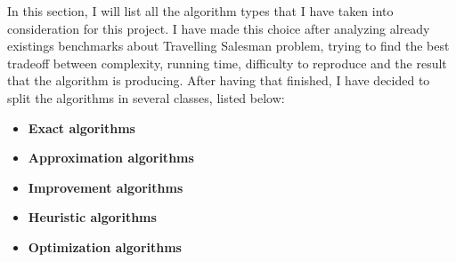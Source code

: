 \documentclass[12pt,twoside,notitlepage]{report}
\begin{document}
In this section, I will list all the algorithm types that I have taken into consideration for this project. I have made this choice after analyzing already existings benchmarks about Travelling Salesman problem, trying to find the best tradeoff between complexity, running time, difficulty to reproduce and the result that the algorithm is producing. After having that finished, I have decided to split the algorithms in several classes, listed below:

\begin{itemize}

\item {\bf Exact algorithms}
\item {\bf Approximation algorithms}
\item {\bf Improvement algorithms}
\item {\bf Heuristic algorithms}
\item {\bf Optimization algorithms} 
\end{itemize}







\end{document}
